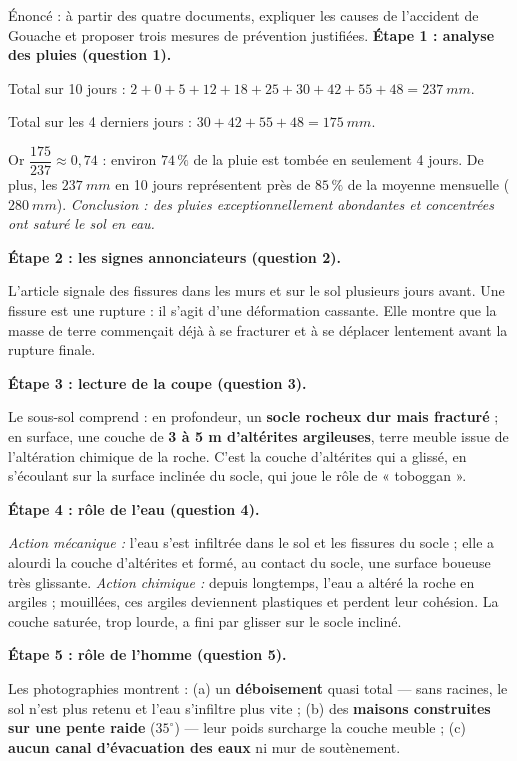\documentclass[11pt]{article}
\newcommand{\cle}[1]{{\popxbold\color{popdark}#1}}
\begin{document}
\begin{exoresolu}
Énoncé : à partir des quatre documents, expliquer les causes de l'accident de Gouache et proposer trois mesures de prévention justifiées.
\tcblower
\textbf{Étape 1 : analyse des pluies (question 1).}

Total sur 10 jours : $2+0+5+12+18+25+30+42+55+48 = \SI{237}{mm}$.

Total sur les 4 derniers jours : $30+42+55+48 = \SI{175}{mm}$.

Or $\dfrac{175}{237} \approx 0,74$ : environ $74\,\%$ de la pluie est tombée en seulement 4 jours. De plus, les $\SI{237}{mm}$ en 10 jours représentent près de $85\,\%$ de la moyenne mensuelle ($\SI{280}{mm}$). \emph{Conclusion : des pluies exceptionnellement abondantes et concentrées ont saturé le sol en eau.}

\textbf{Étape 2 : les signes annonciateurs (question 2).}

L'article signale des fissures dans les murs et sur le sol plusieurs jours avant. Une fissure est une rupture : il s'agit d'une \cle{déformation cassante}. Elle montre que la masse de terre commençait déjà à se fracturer et à se déplacer lentement avant la rupture finale.

\textbf{Étape 3 : lecture de la coupe (question 3).}

Le sous-sol comprend : en profondeur, un \textbf{socle rocheux dur mais fracturé} ; en surface, une couche de \textbf{3 à 5 m d'altérites argileuses}, terre meuble issue de l'altération chimique de la roche. C'est la couche d'altérites qui a glissé, en s'écoulant sur la surface inclinée du socle, qui joue le rôle de « toboggan ».

\textbf{Étape 4 : rôle de l'eau (question 4).}

\emph{Action mécanique :} l'eau s'est infiltrée dans le sol et les fissures du socle ; elle a alourdi la couche d'altérites et formé, au contact du socle, une surface boueuse très glissante. \emph{Action chimique :} depuis longtemps, l'eau a altéré la roche en argiles ; mouillées, ces argiles deviennent plastiques et perdent leur cohésion. La couche saturée, trop lourde, a fini par glisser sur le socle incliné.

\textbf{Étape 5 : rôle de l'homme (question 5).}

Les photographies montrent : (a) un \textbf{déboisement} quasi total — sans racines, le sol n'est plus retenu et l'eau s'infiltre plus vite ; (b) des \textbf{maisons construites sur une pente raide} ($35^{\circ}$) — leur poids surcharge la couche meuble ; (c) \textbf{aucun canal d'évacuation des eaux} ni mur de soutènement.


\end{exoresolu}
\end{document}
